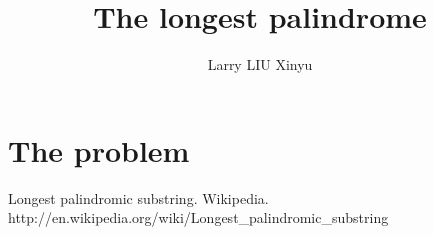 \documentclass{article}
\begin{document}
\title{The longest palindrome}
\author{Larry LIU Xinyu}
\maketitle

\section{The problem}
\begin{thebibliography}{99}

Longest palindromic substring. Wikipedia. http://en.wikipedia.org/wiki/Longest\_palindromic\_substring

\end{thebibliography}
\end{document}
